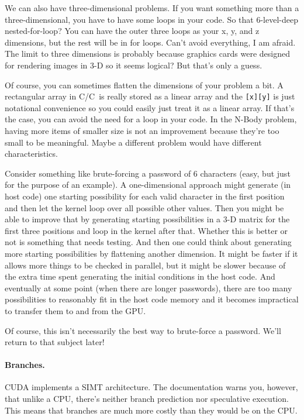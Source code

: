 \documentclass[a4paper]{report}
\newcommand{\CPP}{C\nolinebreak\hspace{-.05em}\raisebox{.4ex}{\tiny\bf +}\nolinebreak\hspace{-.10em}\raisebox{.4ex}{\tiny\bf +}}
\def\CPP{{C\nolinebreak[4]\hspace{-.05em}\raisebox{.4ex}{\tiny\bf ++}}}
\begin{document}
We can also have three-dimensional problems. If you want something more than a three-dimensional, you have to have some loops in your code. So that 6-level-deep nested-for-loop? You can have the outer three loops as your x, y, and z dimensions, but the rest will be in for loops. Can't avoid everything, I am afraid. The limit to three dimensions is probably because graphics cards were designed for rendering images in 3-D so it seems logical? But that's only a guess.

Of course, you can sometimes flatten the dimensions of your problem a bit. A rectangular array in C/\CPP~is really stored as a linear array and the \texttt{[x][y]} is just notational convenience so you could easily just treat it as a linear array. If that's the case, you can avoid the need for a loop in your code. In the N-Body problem, having more items of smaller size is not an improvement because they're too small to be meaningful. Maybe a different problem would have different characteristics.

Consider something like brute-forcing a password of 6 characters (easy, but just for the purpose of an example). A one-dimensional approach might generate (in host code) one starting possibility for each valid character in the first position and then let the kernel loop over all possible other values. Then you might be able to improve that by generating starting possibilities in a 3-D matrix for the first three positions and loop in the kernel after that. Whether this is better or not is something that needs testing. And then one could think about generating more starting possibilities by flattening another dimension. It might be faster if it allows more things to be checked in parallel, but it might be slower because of the extra time spent generating the initial conditions in the host code. And eventually at some point (when there are longer passwords), there are too many possibilities to reasonably fit in the host code memory and it becomes impractical to transfer them to and from the GPU.

Of course, this isn't necessarily the best way to brute-force a password. We'll return to that subject later!

\paragraph{Branches.} CUDA implements a SIMT architecture. The documentation warns you, however, that unlike a CPU, there's neither branch prediction nor speculative execution. This means that branches are much more costly than they would be on the CPU. 
\end{document}
